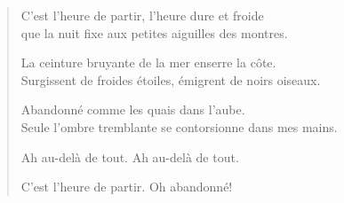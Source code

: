 \documentclass[11pt,a4paper]{book}
\begin{document}
\begin{verse}
  C'est l'heure de partir, l'heure dure et froide \\
  que la nuit fixe aux petites aiguilles des montres.

  La ceinture bruyante de la mer enserre la côte. \\
  Surgissent de froides étoiles, émigrent de noirs oiseaux.

  Abandonné comme les quais dans l'aube. \\
  Seule l'ombre tremblante se contorsionne dans mes mains.

  Ah au-delà de tout. Ah au-delà de tout.

  C'est l'heure de partir. Oh abandonné!
\end{verse}


\end{document}
